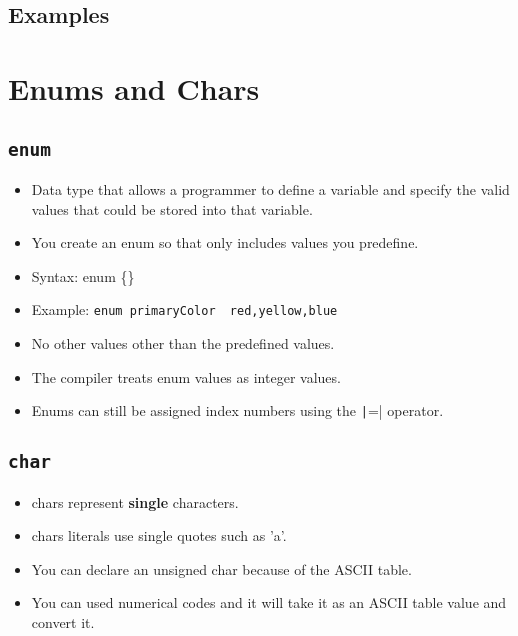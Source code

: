 \subsection{Examples}


\section{Enums and Chars}
\subsection{\texttt{enum}}
\begin{itemize}
    \item Data type that allows a programmer to define a variable and specify the valid values that could be stored into that variable. 
    \item You create an enum so that only includes values you predefine. 
    \item Syntax: enum  \{\}
    \item Example: \texttt{enum primaryColor { red,yellow,blue }}

    \item No other values other than the predefined values. 
    \item The compiler treats enum values as integer values.
    \item Enums can still be assigned index numbers using the \texttt|=| operator. 
\end{itemize}
\subsection{\texttt{char}}
\begin{itemize}
    \item chars represent \textbf{single} characters.
    \item chars literals use single quotes such as 'a'.
    \item You can declare an unsigned char because of the ASCII table. 
    \item You can used numerical codes and it will take it as an ASCII table value and convert it. 
\end{itemize}
